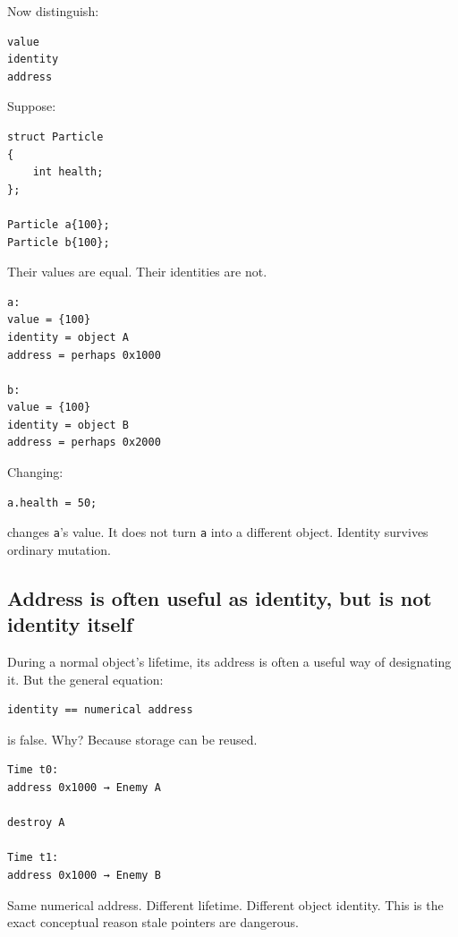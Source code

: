 Now distinguish:

\begin{verbatim}
value
identity
address
\end{verbatim}

Suppose:

\begin{verbatim}
struct Particle
{
    int health;
};

Particle a{100};
Particle b{100};
\end{verbatim}

Their values are equal. Their identities are not.

\begin{verbatim}
a:
value = {100}
identity = object A
address = perhaps 0x1000

b:
value = {100}
identity = object B
address = perhaps 0x2000
\end{verbatim}

Changing:

\begin{verbatim}
a.health = 50;
\end{verbatim}

changes \texttt{a}'s value. It does not turn \texttt{a} into a different object. Identity survives ordinary mutation.

\subsection{Address is often useful as identity, but is not identity itself}\label{05-engine-i-ch002-address-is-often-useful-as-identity-but-is-not-identity-itself}

\hypertarget{05-engine-i-ch002-address-is-often-useful-as-identity-but-is-not-identity-itself}{}

During a normal object's lifetime, its address is often a useful way of designating it. But the general equation:

\begin{verbatim}
identity == numerical address
\end{verbatim}

is false. Why? Because storage can be reused.

\begin{verbatim}
Time t0:
address 0x1000 → Enemy A

destroy A

Time t1:
address 0x1000 → Enemy B
\end{verbatim}

Same numerical address. Different lifetime. Different object identity. This is the exact conceptual reason stale pointers are dangerous.

